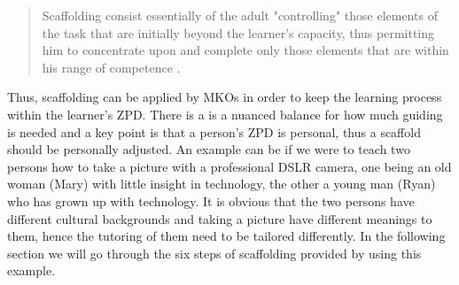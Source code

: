 \begin{quote}Scaffolding consist essentially of the adult "controlling" those elements of the task that are initially beyond the learner’s capacity, thus permitting him to concentrate upon and complete only those elements that are within his range of competence \citep{wood1976role}.
\end{quote}

Thus, scaffolding can be applied by MKOs in order to keep the learning process within the learner’s ZPD. There is a is a nuanced balance for how much guiding is needed and a key point is that a person's ZPD is personal, thus a scaffold should be personally adjusted. An example can be if we were to teach two persons how to take a picture with a professional DSLR camera, one being an old woman (Mary) with little insight in technology, the other a young man (Ryan) who has grown up with technology. It is obvious that the two persons have different cultural backgrounds and taking a picture have different meanings to them, hence the tutoring of them need to be tailored differently. In the following section we will go through the six steps of scaffolding provided by \citet{wood1976role} using this example.


